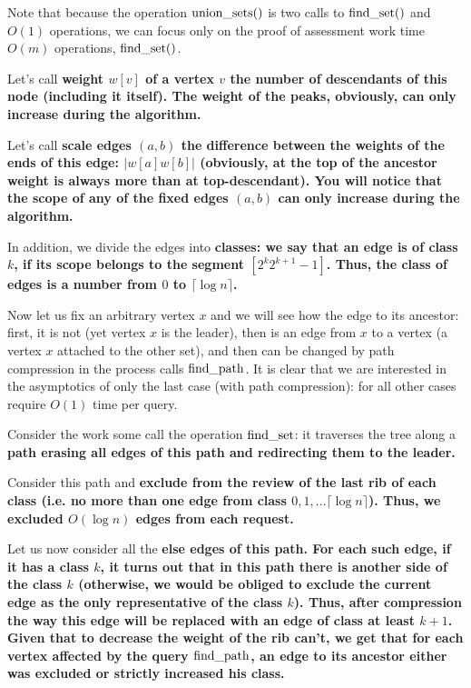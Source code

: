 Note that because the operation ${\rm union\_sets}()$ is two calls to ${\rm find\_set}()$ and $O(1)$ operations, we can focus only on the proof of assessment work time $O(m)$ operations, ${\rm find\_set}()$.

Let's call \bf{weight} $w[v]$ of a vertex $v$ the number of descendants of this node (including it itself). The weight of the peaks, obviously, can only increase during the algorithm.

Let's call \bf{scale edges} $(a,b)$ the difference between the weights of the ends of this edge: $|w[a] w[b]|$ (obviously, at the top of the ancestor weight is always more than at top-descendant). You will notice that the scope of any of the fixed edges $(a,b)$ can only increase during the algorithm.

In addition, we divide the edges into \bf{classes}: we say that an edge is of class $k$, if its scope belongs to the segment $[2^k 2^{k+1}-1]$. Thus, the class of edges is a number from $0$ to $\lceil \log n \rceil$.

Now let us fix an arbitrary vertex $x$ and we will see how the edge to its ancestor: first, it is not (yet vertex $x$ is the leader), then is an edge from $x$ to a vertex (a vertex $x$ attached to the other set), and then can be changed by path compression in the process calls ${\rm find\_path}$. It is clear that we are interested in the asymptotics of only the last case (with path compression): for all other cases require $O(1)$ time per query.

Consider the work some call the operation ${\rm find\_set}$: it traverses the tree along a \bf{path} erasing all edges of this path and redirecting them to the leader.

Consider this path and \bf{exclude} from the review of the last rib of each class (i.e. no more than one edge from class $0, 1, \ldots \lceil \log n \rceil$). Thus, we excluded $O(\log n)$ edges from each request.

Let us now consider all the \bf{else} edges of this path. For each such edge, if it has a class $k$, it turns out that in this path there is another side of the class $k$ (otherwise, we would be obliged to exclude the current edge as the only representative of the class $k$). Thus, after compression the way this edge will be replaced with an edge of class at least $k+1$. Given that to decrease the weight of the rib can't, we get that for each vertex affected by the query $\rm find\_path$, an edge to its ancestor either was excluded or strictly increased his class.


